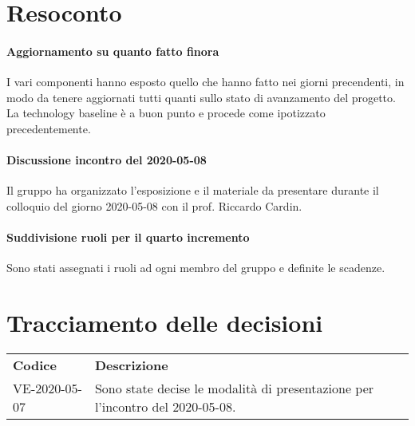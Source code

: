 \documentclass{article}
\begin{document}
\section{Resoconto}%
\label{resoconto}
\paragraph*{Aggiornamento su quanto fatto finora}
I vari componenti hanno esposto quello che hanno fatto nei giorni precendenti, in modo da tenere aggiornati tutti quanti sullo stato di avanzamento del progetto. \\
La technology baseline è a buon punto e procede come ipotizzato precedentemente.
\paragraph*{Discussione incontro del 2020-05-08}
Il gruppo ha organizzato l'esposizione e il materiale da presentare durante il colloquio del giorno 2020-05-08 con il prof. Riccardo Cardin.
\paragraph*{Suddivisione ruoli per il quarto incremento}
Sono stati assegnati i ruoli ad ogni membro del gruppo e definite le scadenze.


\section{Tracciamento delle decisioni}
\begin{table}[H]
  \centering
  \begin{tabular}{p{4cm}|p{12cm}}
    \rowcolor{lightgray}
    \textbf{Codice}  & \textbf{Descrizione}      \\
      VE-2020-05-07 & Sono state decise le modalità di presentazione per l'incontro del 2020-05-08.  \\
  \end{tabular}
\end{table}
\end{document}
